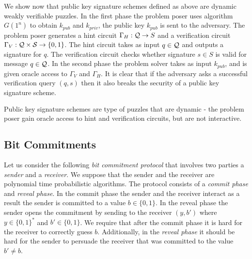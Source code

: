 \documentclass[11pt,a4paper,titlepage]{memoir}
\begin{document}
We show now that public key signature schemes defined as above are dynamic weakly verifiable puzzles.
In the first phase the problem poser uses algorithm $G(1^n)$ to obtain $k_{pub}$ and $k_{priv}$,
the public key $k_{pub}$ is sent to the adversary.
The problem poser generates a hint circuit $\Gamma_H : \mathcal{Q} \rightarrow S$ and a verification circuit $\Gamma_V : \mathcal{Q} \times \mathcal{S} \rightarrow \{0,1\}$.
The hint circuit takes as input $q \in \mathcal{Q}$ and outputs a signature for $q$. The verification circuit checks whether
signature $s \in S$ is valid for message $q \in \mathcal{Q}$.
In the second phase the problem solver takes as input $k_{pub}$, and is given oracle access to $\Gamma_V$ and $\Gamma_H$.
It is clear that if the adversary asks a successful verification query $(q,s)$ then it also breaks the security of a public key signature scheme.

Public key signature schemes are type of puzzles that are dynamic - the problem poser gain oracle access to hint and verification circuits,
but are not interactive.
%
\subsection{Bit Commitments}
Let us consider the following \textit{bit commitment protocol} that involves two parties a \textit{sender} and a \textit{receiver}.
We suppose that the sender and the receiver are polynomial time probabilistic algorithms.
The protocol consists of a \textit{commit phase} and \textit{reveal phase}.
In the commit phase the sender and the receiver interact as a result the sender is committed to a value $b \in \{0,1\}$.
In the reveal phase the sender opens the commitment by sending to the receiver $(y,b')$ where $y \in \{0,1\}^{*}$ and $b' \in \{0,1\}$.
We require that after the commit phase it is hard for the receiver to correctly guess $b$.
Additionally, in the \textit{reveal phase} it should be hard for the sender to persuade the receiver that was committed to the value $b' \neq b$.
\end{document}
